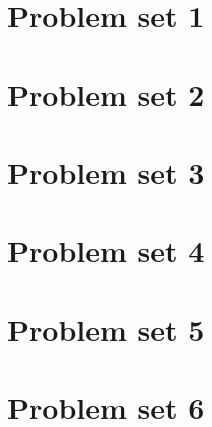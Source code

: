 \documentclass{article}
\newcommand{\addpset}[1]{
	\section{Problem set #1}
	
	\pagebreak
}
\begin{document}
\addpset{1}
\addpset{2}
\addpset{3}
\addpset{4}
\addpset{5}
\addpset{6}
\end{document}
